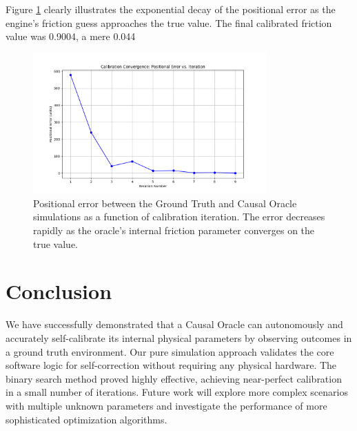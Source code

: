 \documentclass{article}
\begin{document}
Figure \ref{fig:convergence} clearly illustrates the exponential decay of the positional error as the engine's friction guess approaches the true value. The final calibrated friction value was 0.9004, a mere 0.044%

\begin{figure}[h!]
\centering
\includegraphics[width=0.8\textwidth]{figures/calibration_convergence.png}
\caption{Positional error between the Ground Truth and Causal Oracle simulations as a function of calibration iteration. The error decreases rapidly as the oracle's internal friction parameter converges on the true value.}
\label{fig:convergence}
\end{figure}

\section{Conclusion}
We have successfully demonstrated that a Causal Oracle can autonomously and accurately self-calibrate its internal physical parameters by observing outcomes in a ground truth environment. Our pure simulation approach validates the core software logic for self-correction without requiring any physical hardware. The binary search method proved highly effective, achieving near-perfect calibration in a small number of iterations. Future work will explore more complex scenarios with multiple unknown parameters and investigate the performance of more sophisticated optimization algorithms.



\end{document}
